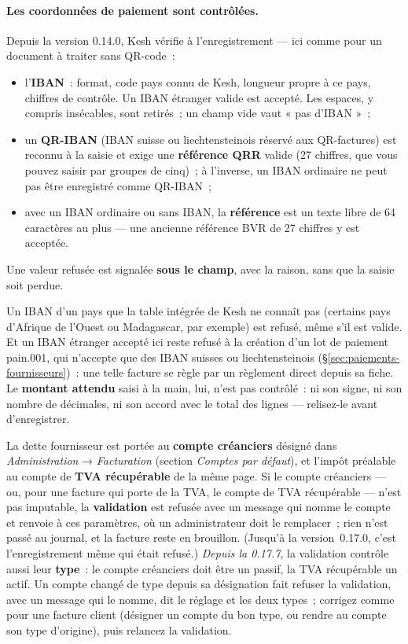 \documentclass[a4paper,11pt,oneside]{article}
\begin{document}
\paragraph{Les coordonnées de paiement sont contrôlées.} Depuis la version 0.14.0, Kesh
vérifie à l'enregistrement --- ici comme pour un document à traiter sans QR-code~:
\begin{itemize}
    \item l'\textbf{IBAN}~: format, code pays connu de Kesh, longueur propre à ce pays,
          chiffres de contrôle. Un IBAN étranger valide est accepté. Les espaces, y compris
          insécables, sont retirés~; un champ vide vaut « pas d'IBAN »~;
    \item un \textbf{QR-IBAN} (IBAN suisse ou liechtensteinois réservé aux QR-factures)
          est reconnu à la saisie et exige une \textbf{référence QRR} valide (27 chiffres,
          que vous pouvez saisir par groupes de cinq)~; à l'inverse, un IBAN ordinaire ne
          peut pas être enregistré comme QR-IBAN~;
    \item avec un IBAN ordinaire ou sans IBAN, la \textbf{référence} est un texte libre de
          64 caractères au plus --- une ancienne référence BVR de 27 chiffres y est
          acceptée.
\end{itemize}
Une valeur refusée est signalée \textbf{sous le champ}, avec la raison, sans que la
saisie soit perdue.

\begin{keshnote}
Un IBAN d'un pays que la table intégrée de Kesh ne connaît pas (certains pays d'Afrique de
l'Ouest ou Madagascar, par exemple) est refusé, même s'il est valide. Et un IBAN étranger
accepté ici reste refusé à la création d'un lot de paiement pain.001, qui n'accepte que des
IBAN suisses ou liechtensteinois (\S\ref{sec:paiements-fournisseurs})~: une telle facture se règle par un
règlement direct depuis sa fiche. Le \textbf{montant attendu} saisi à la main, lui, n'est
pas contrôlé~: ni son signe, ni son nombre de décimales, ni son accord avec le total des
lignes --- relisez-le avant d'enregistrer.
\end{keshnote}

La dette fournisseur est portée au \textbf{compte créanciers} désigné dans
\emph{Administration} → \emph{Facturation} (section \emph{Comptes par défaut}), et
l'impôt préalable au compte de \textbf{TVA récupérable} de la même page. Si le
compte créanciers --- ou, pour une facture qui porte de la TVA, le compte de TVA
récupérable --- n'est pas imputable, la \textbf{validation} est refusée avec un message qui
nomme le compte et renvoie à ces paramètres, où un administrateur doit le
remplacer~; rien n'est passé au journal, et la facture reste en brouillon. (Jusqu'à la
version~0.17.0, c'est l'enregistrement même qui était refusé.) \emph{Depuis la 0.17.7}, la
validation contrôle aussi leur \textbf{type}~: le compte créanciers doit être un passif, la
TVA récupérable un actif. Un compte changé de type depuis sa désignation fait refuser la
validation, avec un message qui le nomme, dit le réglage et les deux types~; corrigez
comme pour une facture client (désigner un compte du bon type, ou rendre au compte son
type d'origine), puis relancez la validation.
\end{document}
